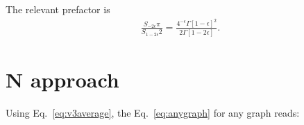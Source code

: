 \documentclass[a4paper,11pt]{article}
\numberwithin{equation}{section}
\newcommand{\dd}{\text{d}}
\newcommand{\eps}{\epsilon}
\begin{document}
%




The relevant prefactor is
\begin{align}
\frac{S_{-2\eps}\pi}{S_{1-2\eps}2}= \frac{4^{-\eps}\Gamma[1-\eps]^2}{2\Gamma[1-2\eps]}.
\end{align}

\section{N approach}

Using Eq.~\eqref{eq:v3average}, the Eq.~\eqref{eq:anygraph} for any graph reads:
\end{document}
